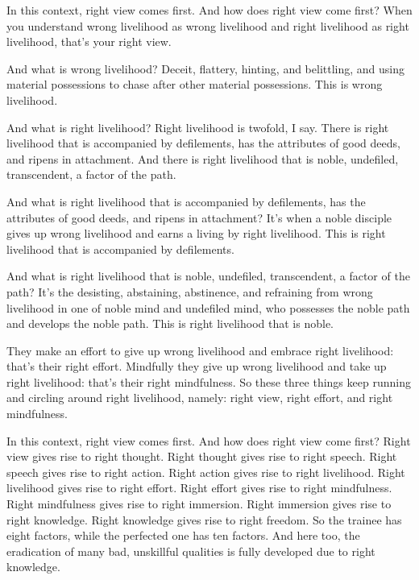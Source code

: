\documentclass[12pt,openany]{book}%
\begin{document}
In this context, right view comes first. And how does right view come first? When you understand wrong livelihood as wrong livelihood and right livelihood as right livelihood, that’s your right view. 

And what is wrong livelihood? Deceit, flattery, hinting, and belittling, and using material possessions to chase after other material possessions. This is wrong livelihood. 

And what is right livelihood? Right livelihood is twofold, I say. There is right livelihood that is accompanied by defilements, has the attributes of good deeds, and ripens in attachment. And there is right livelihood that is noble, undefiled, transcendent, a factor of the path. 

And what is right livelihood that is accompanied by defilements, has the attributes of good deeds, and ripens in attachment? It’s when a noble disciple gives up wrong livelihood and earns a living by right livelihood. This is right livelihood that is accompanied by defilements. 

And what is right livelihood that is noble, undefiled, transcendent, a factor of the path? It’s the desisting, abstaining, abstinence, and refraining from wrong livelihood in one of noble mind and undefiled mind, who possesses the noble path and develops the noble path. This is right livelihood that is noble. 

They make an effort to give up wrong livelihood and embrace right livelihood: that’s their right effort. Mindfully they give up wrong livelihood and take up right livelihood: that’s their right mindfulness. So these three things keep running and circling around right livelihood, namely: right view, right effort, and right mindfulness. 

In this context, right view comes first. And how does right view come first? Right view gives rise to right thought. Right thought gives rise to right speech. Right speech gives rise to right action. Right action gives rise to right livelihood. Right livelihood gives rise to right effort. Right effort gives rise to right mindfulness. Right mindfulness gives rise to right immersion. Right immersion gives rise to right knowledge. Right knowledge gives rise to right freedom. So the trainee has eight factors, while the perfected one has ten factors. And here too, the eradication of many bad, unskillful qualities is fully developed due to right knowledge. 
\end{document}

